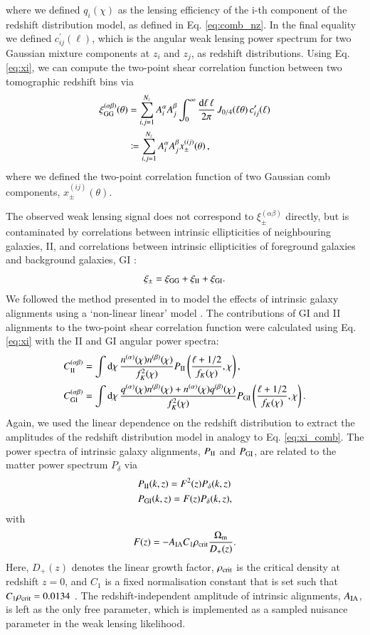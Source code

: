 \documentclass{aa}
\newcommand{\eq}[1]{\begin{equation}  #1 \end{equation}}
\newcommand{\eqa}[1]{\begin{align}   #1 \end{align}}
\newcommand{\dd}{{\rm d}}
\begin{document}
where we defined $q_i(\chi)$ as the lensing efficiency of the i-th component of the redshift distribution model, as defined in Eq. \eqref{eq:comb_nz}. In the final equality we defined $c^\prime_{ij}(\ell)$, which is the angular weak lensing power spectrum for two Gaussian mixture components at $z_i$ and $z_j$, as redshift distributions. Using Eq. \eqref{eq:xi}, we can compute the two-point shear correlation function between two tomographic redshift bins via
\eqa{
\xi_{\rm GG}^{(\alpha\beta)}(\theta) &= \sum_{i,j=1}^{N_z} A_i^\alpha A_j^\beta \int_0^\infty \frac{\dd \ell\, \ell}{2 \pi}\,J _{0/4}(\ell \theta)\, c^\prime_{ij}(\ell)\\
&\coloneqq  \sum_{i,j=1}^{N_z} A_i^\alpha A_j^\beta x_\pm^{(ij)}(\theta)\, ,\label{eq:xi_comb}
}
where we defined the two-point correlation function of two Gaussian comb components, $x_\pm^{(ij)}(\theta)$.

The observed weak lensing signal does not correspond to $\xi_\pm^{(\alpha\beta)}$ directly, but is contaminated by correlations between intrinsic ellipticities of neighbouring galaxies, II, and correlations between intrinsic ellipticities of foreground galaxies and background galaxies, GI \citep{hirata04}:
\eq{
\xi_\pm = \xi_{\rm GG} + \xi_{\rm II}+ \xi_{\rm GI}.
}
We followed the method presented in \cite{hildebrandt17} to model the effects of intrinsic galaxy alignments using a `non-linear linear' model \citep{hirata04,bridle07,joachimi11}. The contributions of GI and II alignments to the two-point shear correlation function were calculated using Eq. \eqref{eq:xi} with the II and GI angular power spectra:
\eqa{
C_{\rm II}^{(\alpha\beta)} &=\int\dd\chi\,\frac{n^{(\alpha)}(\chi)n^{(\beta)}(\chi)}{f_K^2(\chi)}P_{\rm II}\left(\frac{\ell + 1/2}{f_K(\chi)},\chi\right),\\ 
C_{\rm GI}^{(\alpha\beta)} &=\int\dd\chi\,\frac{q^{(\alpha)}(\chi)n^{(\beta)}(\chi)+n^{(\alpha)}(\chi)q^{(\beta)}(\chi)}{f_K^2(\chi)}P_{\rm GI}\left(\frac{\ell + 1/2}{f_K(\chi)},\chi\right).
}
Again, we used the linear dependence on the redshift distribution to extract the amplitudes of the redshift distribution model in analogy to Eq. \eqref{eq:xi_comb}. 
The power spectra of intrinsic galaxy alignments, $P_{\rm II}$ and $P_{\rm GI}$, are related to the matter power spectrum $P_\delta$ via
\eqa{
&P_{\rm II}(k,z) = F^2(z) P_\delta(k,z)\label{eq:P_II}\\
&P_{\rm GI}(k,z) = F(z) P_\delta(k,z),\label{eq:P_GI}
}
with
\eq{
\label{eq:F_z}
F(z) = -A_{\rm IA}C_1\rho_{\rm crit} \frac{\Omega_{\rm m}}{D_+(z)}.
}
Here, $D_+(z)$ denotes the linear growth factor, $\rho_{\rm crit}$ is the critical density at redshift $z=0$, and $C_1$ is a fixed normalisation constant that is set such that $C_1\rho_{\rm crit} = 0.0134$ \citep{joachimi11}. The redshift-independent amplitude of intrinsic alignments, $A_{\rm IA}$, is left as the only free parameter, which is implemented as a sampled nuisance parameter in the weak lensing likelihood. 
\end{document}
